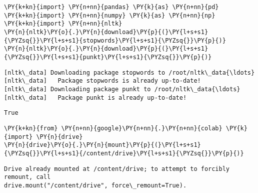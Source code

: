 \begin{tcolorbox}[breakable, size=fbox, boxrule=1pt, pad at break*=1mm,colback=cellbackground, colframe=cellborder]
\begin{Verbatim}[commandchars=\\\{\}]
\PY{k+kn}{import} \PY{n+nn}{pandas} \PY{k}{as} \PY{n+nn}{pd}
\PY{k+kn}{import} \PY{n+nn}{numpy} \PY{k}{as} \PY{n+nn}{np}
\PY{k+kn}{import} \PY{n+nn}{nltk}
\PY{n}{nltk}\PY{o}{.}\PY{n}{download}\PY{p}{(}\PY{l+s+s1}{\PYZsq{}}\PY{l+s+s1}{stopwords}\PY{l+s+s1}{\PYZsq{}}\PY{p}{)}
\PY{n}{nltk}\PY{o}{.}\PY{n}{download}\PY{p}{(}\PY{l+s+s1}{\PYZsq{}}\PY{l+s+s1}{punkt}\PY{l+s+s1}{\PYZsq{}}\PY{p}{)}
\end{Verbatim}
\end{tcolorbox}

    \begin{Verbatim}[commandchars=\\\{\}]
[nltk\_data] Downloading package stopwords to /root/nltk\_data{\ldots}
[nltk\_data]   Package stopwords is already up-to-date!
[nltk\_data] Downloading package punkt to /root/nltk\_data{\ldots}
[nltk\_data]   Package punkt is already up-to-date!
    \end{Verbatim}

            \begin{tcolorbox}[breakable, size=fbox, boxrule=.5pt, pad at break*=1mm, opacityfill=0]
\begin{Verbatim}[commandchars=\\\{\}]
True
\end{Verbatim}
\end{tcolorbox}
        
    \begin{tcolorbox}[breakable, size=fbox, boxrule=1pt, pad at break*=1mm,colback=cellbackground, colframe=cellborder]
\begin{Verbatim}[commandchars=\\\{\}]
\PY{k+kn}{from} \PY{n+nn}{google}\PY{n+nn}{.}\PY{n+nn}{colab} \PY{k}{import} \PY{n}{drive}
\PY{n}{drive}\PY{o}{.}\PY{n}{mount}\PY{p}{(}\PY{l+s+s1}{\PYZsq{}}\PY{l+s+s1}{/content/drive}\PY{l+s+s1}{\PYZsq{}}\PY{p}{)}
\end{Verbatim}
\end{tcolorbox}

    \begin{Verbatim}[commandchars=\\\{\}]
Drive already mounted at /content/drive; to attempt to forcibly remount, call
drive.mount("/content/drive", force\_remount=True).
    \end{Verbatim}

